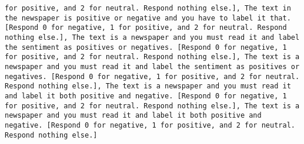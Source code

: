 \begin{lstlisting}[label=lst:poor_performing_prompts]
for positive, and 2 for neutral. Respond nothing else.], The text in the newspaper is positive or negative and you have to label it that. [Respond 0 for negative, 1 for positive, and 2 for neutral. Respond nothing else.], The text is a newspaper and you must read it and label the sentiment as positives or negatives. [Respond 0 for negative, 1 for positive, and 2 for neutral. Respond nothing else.], The text is a newspaper and you must read it and label the sentiment as positives or negatives. [Respond 0 for negative, 1 for positive, and 2 for neutral. Respond nothing else.], The text is a newspaper and you must read it and label it both positive and negative. [Respond 0 for negative, 1 for positive, and 2 for neutral. Respond nothing else.], The text is a newspaper and you must read it and label it both positive and negative. [Respond 0 for negative, 1 for positive, and 2 for neutral. Respond nothing else.]

\end{lstlisting}
